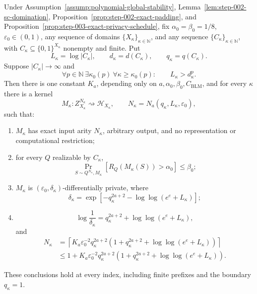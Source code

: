 \begin{proposition}
\label{prop:step-006-sequence-learners}
Under Assumption~\ref{assump:polynomial-global-stability},
Lemma~\ref{lem:step-002-sc-domination},
Proposition~\ref{prop:step-002-exact-padding}, and
Proposition~\ref{prop:step-003-exact-privacy-schedule}, fix
\(\alpha_0=\beta_0=1/8\), \(\varepsilon_0\in(0,1)\), any sequence of
domains \(\{X_\kappa\}_{\kappa\in\mathbb N}\), and any sequence
\(\{C_\kappa\}_{\kappa\in\mathbb N}\), with
\(C_\kappa\subseteq\{0,1\}^{X_\kappa}\) nonempty and finite.  Put
\[
L_\kappa=\log|C_\kappa|,\qquad
d_\kappa=d(C_\kappa),\qquad q_\kappa=q(C_\kappa).
\]
Suppose \(|C_\kappa|\to\infty\) and
\[
\forall p\in\mathbb N\ \exists\kappa_0(p)\
\forall\kappa\geq\kappa_0(p):
\qquad L_\kappa>d_\kappa^p.
\]
Then there is one constant \(K_a\),
depending only on \(a,\alpha_0,\beta_0,C_{\mathrm{BLM}}\), and for
every \(\kappa\) there is a kernel
\begin{equation}
M_\kappa:
Z_{X_\kappa}^{N_\kappa}
\rightsquigarrow\mathcal H_{X_\kappa},
\qquad
N_\kappa=N_a(q_\kappa,L_\kappa,\varepsilon_0),
\label{eq:app-a111}
\end{equation}
such that:
\begin{enumerate}[label=(\roman*)]
\item \(M_\kappa\) has exact input arity \(N_\kappa\), arbitrary
output, and no representation or computational restriction;
\item for every \(Q\) realizable by \(C_\kappa\),
\begin{equation}
\Pr_{S\sim Q^{N_\kappa},M_\kappa}
[R_Q(M_\kappa(S))>\alpha_0]\leq\beta_0;
\label{eq:app-a112}
\end{equation}
\item \(M_\kappa\) is
\((\varepsilon_0,\delta_\kappa)\)-differentially private, where
\begin{equation}
\delta_\kappa
=\exp[-q_\kappa^{2a+2}
-\log\log(e^e+L_\kappa)];
\label{eq:app-a113}
\end{equation}
\item
\begin{equation}
\log\frac1{\delta_\kappa}
=q_\kappa^{2a+2}+\log\log(e^e+L_\kappa),
\label{eq:app-a114}
\end{equation}
and
\begin{equation}
\begin{aligned}
N_\kappa
&=
\left\lceil
K_a\varepsilon_0^{-2}q_\kappa^{2a+2}
\left(
1+q_\kappa^{2a+2}
+\log\log(e^e+L_\kappa)
\right)
\right\rceil\\
&\leq
1+K_a\varepsilon_0^{-2}q_\kappa^{2a+2}
\left(
1+q_\kappa^{2a+2}
+\log\log(e^e+L_\kappa)
\right).
\end{aligned}
\label{eq:app-a115}
\end{equation}
\end{enumerate}
These conclusions hold at every index, including finite prefixes and
the boundary \(q_\kappa=1\).
\end{proposition}

